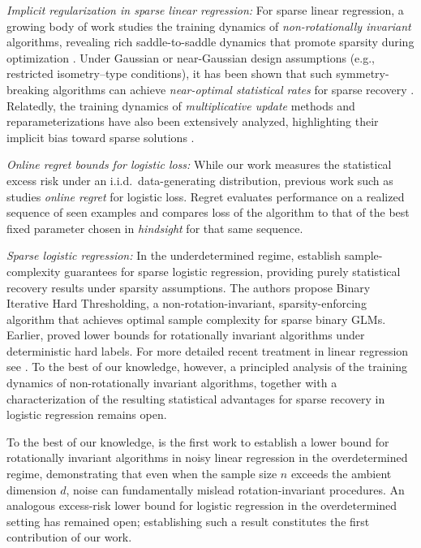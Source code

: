 \documentclass{article}
\theoremstyle{plain}
\theoremstyle{definition}
\theoremstyle{remark}
\begin{document}
{\textit{Implicit regularization in sparse linear regression:}
For sparse linear regression, a growing body of work studies the training dynamics of \emph{non-rotationally invariant} algorithms, revealing rich saddle-to-saddle dynamics that promote sparsity during optimization \cite{pesme2023saddle, pesme2024implicit, even2023s, gunasekar2017implicit, jacot2021saddle, saxe2013exact, gissin2019implicit,poon2021smooth,ghosh2025learning}. Under Gaussian or near-Gaussian design assumptions (e.g., restricted isometry–type conditions), it has been shown that such symmetry-breaking algorithms can achieve \emph{near-optimal statistical rates} for sparse recovery \cite{vaskevicius2019implicit, vaskevicius2020statistical, zhou2023implicit, woodworth2020kernel}. Relatedly, the training dynamics of \emph{multiplicative update} methods and reparameterizations have also been extensively analyzed, highlighting their implicit bias toward sparse solutions \cite{amid2020reparameterizing, amid2020winnowing, amid2022step, kivinen1997exponentiated, majidi2021exponentiated, warmuth2021case}.

\textit{Online regret bounds for logistic loss:} While our work measures the statistical excess risk under an i.i.d.\ data-generating distribution, previous work such as \cite{shamir2020logistic} studies \emph{online regret} for logistic loss. Regret evaluates performance on a realized sequence of seen examples and compares loss of the algorithm to that of the best fixed parameter chosen in \textit{hindsight} for that same sequence.


\textit{Sparse logistic regression:}
In the underdetermined regime, \citet{matsumoto2025learning} establish sample-complexity guarantees for sparse logistic regression, providing purely statistical recovery results under sparsity assumptions. The authors propose Binary Iterative Hard Thresholding, a non-rotation-invariant, sparsity-enforcing algorithm that achieves optimal sample complexity for sparse binary GLMs. Earlier, \citet{ng2004feature} proved lower bounds for rotationally invariant algorithms under deterministic hard labels. For more detailed recent treatment in linear regression see \cite{warmuth2021case}. 
To the best of our knowledge, however, a principled analysis of the training dynamics of non-rotationally invariant algorithms, together with a characterization of the resulting statistical advantages for sparse recovery in logistic regression remains open.


To the best of our knowledge, \citet{pmlr-v272-warmuth25a} is the first work to establish a lower bound for rotationally invariant algorithms in noisy linear regression in the overdetermined regime, demonstrating that even when the sample size $n$ exceeds the ambient dimension $d$, noise can fundamentally mislead rotation-invariant procedures. An analogous excess-risk lower bound for logistic regression in the overdetermined setting has remained open; establishing such a result constitutes the first contribution of our work. 
 

}
\end{document}
